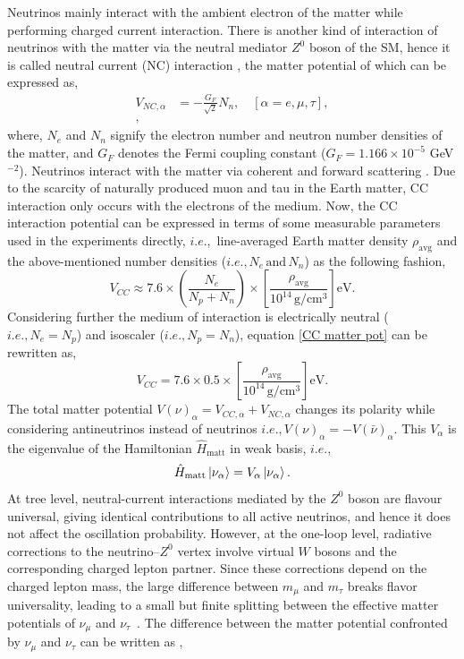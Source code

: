 Neutrinos mainly interact with the ambient electron of the matter while performing charged current interaction. There is another kind of interaction of neutrinos with the matter via the neutral mediator $Z^0$ boson of the SM, hence it is called neutral current (NC) interaction \cite{Linder:2005fc}, the matter potential of which can be expressed as,
\begin{align}
    V_{NC,\alpha} &= -\frac{G_F}{\sqrt{2}} N_n, \quad [\alpha = e, \mu, \tau], \\\nonumber,
\end{align}
where, $N_e$ and $N_n$ signify the electron number and neutron number densities of the matter, and $G_F$ denotes the Fermi coupling constant 
 ($G_F=1.166\times10^{-5}$ GeV$^{-2}$). Neutrinos interact with the matter via coherent and forward scattering \cite{COHERENT:2020iec}. Due to the scarcity of naturally produced muon and tau in the Earth matter, CC interaction only occurs with the electrons of the medium. Now, the CC interaction potential can be expressed in terms of some measurable parameters used in the experiments directly, $i.e.,$ line-averaged Earth matter density  $\rho_{\text{avg}}$ \cite{Kelly:2018kmb} and the above-mentioned number densities ($i.e., N_e \,\mathrm{and}\, N_n$) as the following fashion,
 \begin{equation}
     V_{CC}\approx 7.6\times\left(\frac{N_e}{N_p+N_n}\right)\times\left[\frac{\rho_{\text{avg}}}{10^{14} \,\mathrm{g/cm^{3}}}\right] \mathrm{eV}.
     \label{CC matter pot}
 \end{equation}
Considering further the medium of interaction is electrically neutral ($i.e., N_e=N_p$) and isoscaler ($i.e., N_p=N_n$), equation \ref{CC matter pot} can be rewritten as,
\begin{equation}
    V_{CC} = 7.6 \times 0.5 \times\left[\frac{\rho_{\text{avg}}}{10^{14}\, \mathrm{g/ cm^{3}}}\right] \mathrm{eV}.
\end{equation}
The total matter potential $V(\nu)_\alpha = V_{CC,\alpha}+V_{NC,\alpha}$ changes its polarity while considering antineutrinos instead of neutrinos $i.e., V(\nu)_\alpha = -V(\bar{\nu})_\alpha $. This $V_\alpha$ is the eigenvalue of the Hamiltonian $\hat{H}_{\mathrm{matt}}$ in weak basis, $i.e.,$
\begin{equation}
    \hat{H}_{\mathrm{matt}}\ket{\nu_\alpha}= V_\alpha\ket{\nu_\alpha}.
\end{equation}
 At tree level, neutral-current interactions mediated by the $Z^0$ boson are flavour universal, giving identical contributions to all active neutrinos, and hence it does not affect the oscillation probability. However, at the one-loop level, radiative corrections to the neutrino--$Z^0$ vertex involve virtual $W$ bosons and the corresponding charged lepton partner. Since these corrections depend on the charged lepton mass, the large difference between $m_\mu$ and $m_\tau$ breaks flavor universality, leading to a small but finite splitting between the effective matter potentials of $\nu_\mu$ and $\nu_\tau$~\cite{Botella:1986wy}. The difference between the matter potential confronted by $\nu_\mu$ and $\nu_\tau$ can be written as \cite{Mirizzi:2009td},
